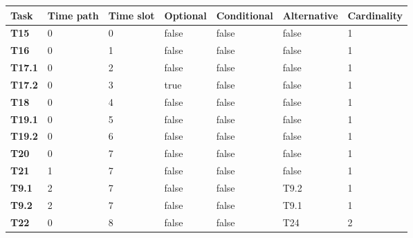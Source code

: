 \begin{table}[h]\label{tab:MPERS_DTMC_SLOTS}
{\renewcommand{\arraystretch}{1.5}
\begin{tabularx}{\textwidth}{@{}lllllll@{}}
\toprule
\textbf{Task}  & \textbf{Time path} & \textbf{Time slot} & \textbf{Optional} & \textbf{Conditional} & \textbf{Alternative} & Cardinality \\ \midrule
\textbf{T15}   & 0                  & 0                  & false             & false                & false                & 1           \\
\textbf{T16}   & 0                  & 1                  & false             & false                & false                & 1           \\
\textbf{T17.1} & 0                  & 2                  & false             & false                & false                & 1           \\
\textbf{T17.2} & 0                  & 3                  & true              & false                & false                & 1           \\
\textbf{T18}   & 0                  & 4                  & false             & false                & false                & 1           \\
\textbf{T19.1} & 0                  & 5                  & false             & false                & false                & 1           \\
\textbf{T19.2} & 0                  & 6                  & false             & false                & false                & 1           \\
\textbf{T20}   & 0                  & 7                  & false             & false                & false                & 1           \\
\textbf{T21}   & 1                  & 7                  & false             & false                & false                & 1           \\
\textbf{T9.1}  & 2                  & 7                  & false             & false                & T9.2                 & 1           \\
\textbf{T9.2}  & 2                  & 7                  & false             & false                & T9.1                 & 1           \\
\textbf{T22}   & 0                  & 8                  & false             & false                & T24                  & 2           \\

\end{tabularx}}
\end{table}

